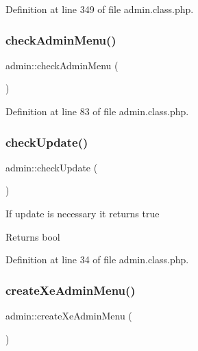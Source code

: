 Definition at line 349 of file admin.\+class.\+php.

\hypertarget{classadmin_a622d33c49486a3cc46b5a008f46ac042}{}\label{classadmin_a622d33c49486a3cc46b5a008f46ac042} 
\subsubsection{\texorpdfstring{check\+Admin\+Menu()}{checkAdminMenu()}}
{\footnotesize\ttfamily admin\+::check\+Admin\+Menu (\begin{DoxyParamCaption}{ }\end{DoxyParamCaption})}



Definition at line 83 of file admin.\+class.\+php.

\hypertarget{classadmin_a62866d2839425085eefda928670d2638}{}\label{classadmin_a62866d2839425085eefda928670d2638} 
\subsubsection{\texorpdfstring{check\+Update()}{checkUpdate()}}
{\footnotesize\ttfamily admin\+::check\+Update (\begin{DoxyParamCaption}{ }\end{DoxyParamCaption})}

If update is necessary it returns true \begin{DoxyReturn}{Returns}
bool 
\end{DoxyReturn}


Definition at line 34 of file admin.\+class.\+php.

\hypertarget{classadmin_a850ae671be9e3dc869230bd8daeb06ec}{}\label{classadmin_a850ae671be9e3dc869230bd8daeb06ec} 
\subsubsection{\texorpdfstring{create\+Xe\+Admin\+Menu()}{createXeAdminMenu()}}
{\footnotesize\ttfamily admin\+::create\+Xe\+Admin\+Menu (\begin{DoxyParamCaption}{ }\end{DoxyParamCaption})}

